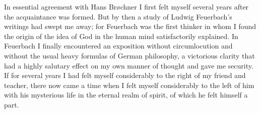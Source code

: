 \documentclass[12pt,a4paper]{article}
\begin{document}
In essential agreement with Hans Brøchner I first felt myself several
years after the acquaintance was formed. But by then a study of Ludwig
Feuerbach's writings had swept me away; for Feuerbach was the first
thinker in whom I found the origin of the idea of God in the human mind
satisfactorily explained. In Feuerbach I finally encountered an
exposition without circumlocution and without the usual heavy formulas
of German philosophy, a victorious clarity that had a highly salutary
effect on my own manner of thought and gave me security. If for several
years I had felt myself considerably to the right of my friend and
teacher, there now came a time when I felt myself considerably to the
left of him with his mysterious life in the eternal realm of spirit, of
which he felt himself a part.
\end{document}
